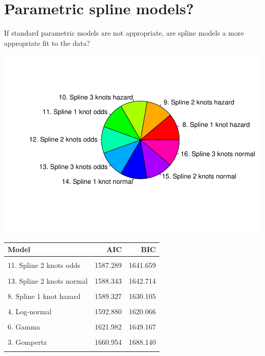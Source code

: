 \documentclass[]{article}
\begin{document}
\newpage

\section{Parametric spline models?}\label{parametric-spline-models}

If standard parametric models are not appropriate, are spline models a
more appropriate fit to the data?

\begin{flushleft}\includegraphics{Images/spline-1} \end{flushleft}

\begin{table}[H]
\centering
\begin{tabular}{lrr}
\toprule
Model & AIC & BIC\\
\midrule
\cellcolor{gray!6}{9. Spline 2 knots hazard} & \cellcolor{gray!6}{1585.894} & \cellcolor{gray!6}{1640.264}\\
11. Spline 2 knots odds & 1587.289 & 1641.659\\
\cellcolor{gray!6}{12. Spline 1 knot normal} & \cellcolor{gray!6}{1587.682} & \cellcolor{gray!6}{1628.460}\\
13. Spline 2 knots normal & 1588.343 & 1642.714\\
\cellcolor{gray!6}{7. Generalised Gamma} & \cellcolor{gray!6}{1589.049} & \cellcolor{gray!6}{1629.826}\\
8. Spline 1 knot hazard & 1589.327 & 1630.105\\
\cellcolor{gray!6}{10. Spline 1 knot odds} & \cellcolor{gray!6}{1590.221} & \cellcolor{gray!6}{1630.999}\\
4. Log-normal & 1592.880 & 1620.066\\
\cellcolor{gray!6}{5. Log-logistic} & \cellcolor{gray!6}{1609.294} & \cellcolor{gray!6}{1636.479}\\
6. Gamma & 1621.982 & 1649.167\\
\cellcolor{gray!6}{2. Weibull} & \cellcolor{gray!6}{1632.618} & \cellcolor{gray!6}{1659.803}\\
3. Gompertz & 1660.954 & 1688.140\\
\cellcolor{gray!6}{1. Exponential} & \cellcolor{gray!6}{1668.212} & \cellcolor{gray!6}{1681.805}\\
\bottomrule
\end{tabular}
\end{table}
\end{document}
